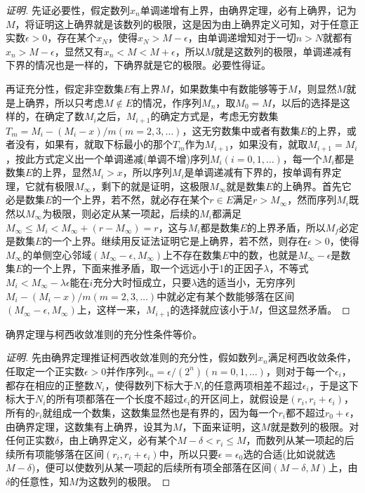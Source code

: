\begin{proof}[证明]
  先证必要性，假定数列$x_n$单调递增有上界，由确界定理，必有上确界，记为$M$，将证明这上确界就是该数列的极限，这是因为由上确界定义可知，对于任意正实数$\epsilon>0$，存在某个$x_N$，使得$x_N>M-\epsilon$，由单调递增知对于一切$n>N$就都有$x_n>M-\epsilon$，显然又有$x_n<M<M+\epsilon$，所以$M$就是这数列的极限，单调递减有下界的情况也是一样的，下确界就是它的极限。必要性得证。

  再证充分性，假定非空数集$E$有上界$M$，如果数集中有数能够等于$M$，则显然$M$就是上确界，所以只考虑$M\notin E$的情况，作序列$M_n$，取$M_0=M$，以后的选择是这样的，在确定了数$M_i$之后，$M_{i+1}$的确定方式是，考虑无穷数集$T_m = M_i-(M_i-x)/m(m=2,3,\ldots)$，这无穷数集中或者有数集$E$的上界，或者没有，如果有，就取下标最小的那个$T_m$作为$M_{i+1}$，如果没有，就取$M_{i+1}=M_i$，按此方式定义出一个单调递减(单调不增)序列$M_i(i=0,1,\ldots)$，每一个$M_i$都是数集$E$的上界，显然$M_i>x$，所以序列$M_i$是单调递减有下界的，按单调有界定理，它就有极限$M_{\infty}$，剩下的就是证明，这极限$M_{\infty}$就是数集$E$的上确界。首先它必是数集$E$的一个上界，若不然，就必存在某个$r \in E$满足$r>M_{\infty}$，然而序列$M_i$既然以$M_{\infty}$为极限，则必定从某一项起，后续的$M_i$都满足$M_{\infty} \leqslant M_i<M_{\infty}+(r-M_{\infty})=r$，这与$M_i$都是数集$E$的上界矛盾，所以$M_f$必定是数集$E$的一个上界。继续用反证法证明它是上确界，若不然，则存在$\epsilon > 0$，使得$M_{\infty}$的单侧空心邻域$(M_{\infty}-\epsilon, M_{\infty})$上不存在数集$E$中的数，也就是$M_{\infty}-\epsilon$是数集$E$的一个上界，下面来推矛盾，取一个远远小于1的正因子$\lambda$，不等式$M_i<M_{\infty}-\lambda \epsilon$能在$i$充分大时恒成立，只要$\lambda$选的适当小，无穷序列$M_i-(M_i-x)/m(m=2,3,\ldots)$中就必定有某个数能够落在区间$(M_{\infty}-\epsilon, M_{\infty})$上，这样一来，$M_{i+1}$的选择就应该小于$M$，但这显然矛盾。
\end{proof}

\begin{theorem}
  确界定理与柯西收敛准则的充分性条件等价。
\end{theorem}

\begin{proof}[证明]
  先由确界定理推证柯西收敛准则的充分性，假如数列$x_n$满足柯西收敛条件，任取定一个正实数$\epsilon>0$并作序列$\epsilon_n=\epsilon / (2^n)(n=0,1,\ldots)$，则对于每一个$\epsilon_i$，都存在相应的正整数$N_i$，使得数列下标大于$N_i$的任意两项相差不超过$\epsilon_i$，于是这下标大于$N_i$的所有项都落在一个长度不超过$\epsilon_i$的开区间上，就假设是$(r_i, r_i+\epsilon_i)$，所有的$r_i$就组成一个数集，这数集显然也是有界的，因为每一个$r_i$都不超过$r_0+\epsilon$，由确界定理，这数集有上确界，设其为$M$，下面来证明，这$M$就是数列的极限。对任何正实数$\delta$，由上确界定义，必有某个$M-\delta<r_i\leqslant M$，而数列从某一项起的后续所有项能够落在区间$(r_i,r_i+\epsilon_i)$中，所以只要$\epsilon=\epsilon_0$选的合适(比如说就选$M-\delta$)，便可以使数列从某一项起的后续所有项全部落在区间$(M-\delta, M)$上，由$\delta$的任意性，知$M$为这数列的极限。
\end{proof}

